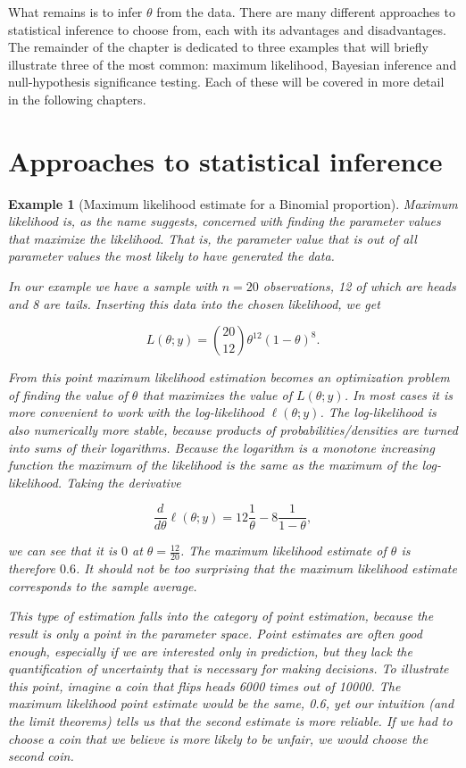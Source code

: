 \documentclass{book}
\theoremstyle{plain}%
\newtheorem{prototheorem}{Example}[section]
\newenvironment{cexample}
   {\colorlet{shadecolor}{gray!10}\begin{shaded}\begin{prototheorem}}
   {\end{prototheorem}\end{shaded}}
\theoremstyle{definition}
\begin{document}
What remains is to infer $\theta$ from the data. There are many different approaches to statistical inference to choose from, each with its advantages and disadvantages. The remainder of the chapter is dedicated to three examples that will briefly illustrate three of the most common: maximum likelihood, Bayesian inference and null-hypothesis significance testing. Each of these will be covered in more detail in the following chapters.
 
\section{Approaches to statistical inference}
 
\begin{cexample}[Maximum likelihood estimate for a Binomial proportion]
Maximum likelihood is, as the name suggests, concerned with finding the parameter values that maximize the likelihood. That is, the parameter value that is out of all parameter values the most likely to have generated the data.

In our example we have a sample with $n = 20$ observations, 12 of which are heads and 8 are tails. Inserting this data into the chosen likelihood, we get

$$L(\theta;y) = {20 \choose 12} \theta^{12}(1-\theta)^{8}.$$

From this point maximum likelihood estimation becomes an optimization problem of finding the value of $\theta$ that maximizes the value of $L(\theta;y)$. In most cases it is more convenient to work with the log-likelihood $\ell(\theta;y)$. The log-likelihood is also numerically more stable, because products of probabilities/densities are turned into sums of their logarithms. Because the logarithm is a monotone increasing function the maximum of the likelihood is the same as the maximum of the log-likelihood. Taking the derivative

$$\frac{d}{d\theta} \ell(\theta;y) = 12 \frac{1}{\theta} - 8 \frac{1}{1-\theta},$$

we can see that it is $0$ at $\theta = \frac{12}{20}$. The maximum likelihood estimate of $\theta$ is therefore $0.6$. It should not be too surprising that the maximum likelihood estimate corresponds to the sample average.

This type of estimation falls into the category of \textit{point estimation}, because the result is only a point in the parameter space. Point estimates are often good enough, especially if we are interested only in prediction, but they lack the quantification of uncertainty that is necessary for making decisions. To illustrate this point, imagine a coin that flips heads 6000 times out of 10000. The maximum likelihood point estimate would be the same, 0.6, yet our intuition (and the limit theorems) tells us that the second estimate is more reliable. If we had to choose a coin that we believe is more likely to be unfair, we would choose the second coin.


\end{cexample}
\end{document}

